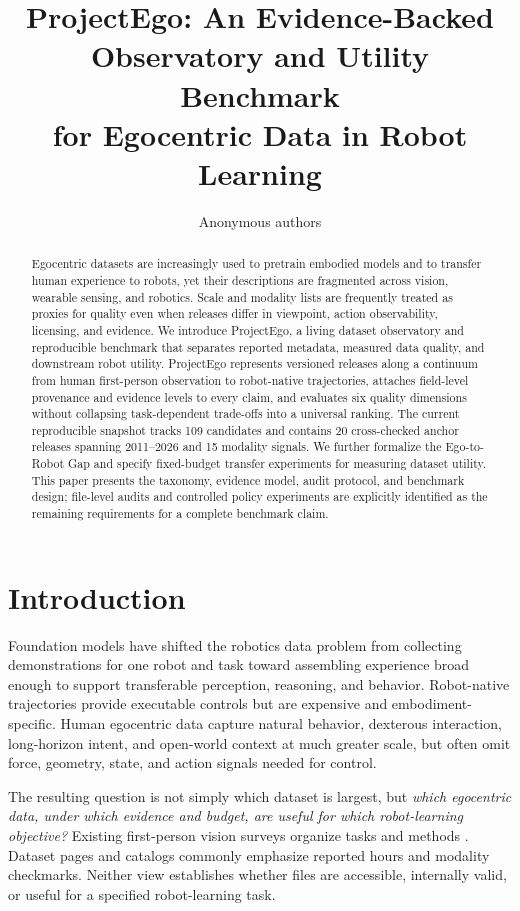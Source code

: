 \documentclass{article}
\title{ProjectEgo: An Evidence-Backed Observatory and Utility Benchmark\\for Egocentric Data in Robot Learning}
\author{Anonymous authors}
\begin{document}
\maketitle

\begin{abstract}
Egocentric datasets are increasingly used to pretrain embodied models and to transfer human experience to robots, yet their descriptions are fragmented across vision, wearable sensing, and robotics. Scale and modality lists are frequently treated as proxies for quality even when releases differ in viewpoint, action observability, licensing, and evidence. We introduce ProjectEgo, a living dataset observatory and reproducible benchmark that separates reported metadata, measured data quality, and downstream robot utility. ProjectEgo represents versioned releases along a continuum from human first-person observation to robot-native trajectories, attaches field-level provenance and evidence levels to every claim, and evaluates six quality dimensions without collapsing task-dependent trade-offs into a universal ranking. The current reproducible snapshot tracks 109 candidates and contains 20 cross-checked anchor releases spanning 2011--2026 and 15 modality signals. We further formalize the Ego-to-Robot Gap and specify fixed-budget transfer experiments for measuring dataset utility. This paper presents the taxonomy, evidence model, audit protocol, and benchmark design; file-level audits and controlled policy experiments are explicitly identified as the remaining requirements for a complete benchmark claim.
\end{abstract}

\section{Introduction}

Foundation models have shifted the robotics data problem from collecting demonstrations for one robot and task toward assembling experience broad enough to support transferable perception, reasoning, and behavior. Robot-native trajectories provide executable controls but are expensive and embodiment-specific. Human egocentric data capture natural behavior, dexterous interaction, long-horizon intent, and open-world context at much greater scale, but often omit force, geometry, state, and action signals needed for control.

The resulting question is not simply which dataset is largest, but \emph{which egocentric data, under which evidence and budget, are useful for which robot-learning objective?} Existing first-person vision surveys organize tasks and methods \citep{betancourt2015evolution,bandini2023hands,yao2021future,plizzari2024outlook,li2025challenges}. Dataset pages and catalogs commonly emphasize reported hours and modality checkmarks. Neither view establishes whether files are accessible, internally valid, or useful for a specified robot-learning task.
\end{document}
